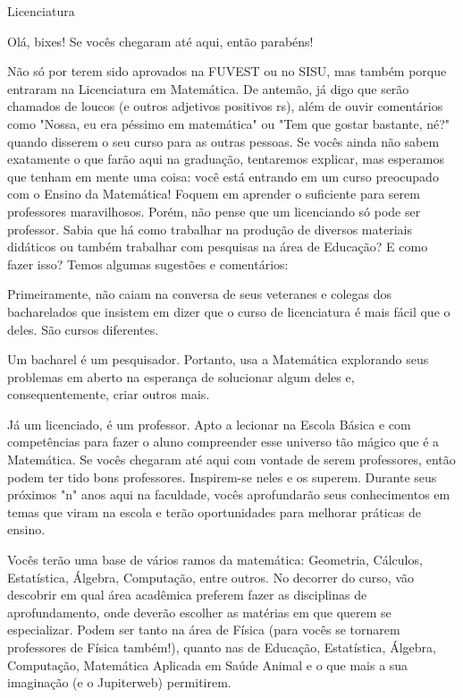 \begin{subsecao}{Licenciatura}

Olá, bixes! Se vocês chegaram até aqui, então parabéns!

Não só por terem sido aprovados na FUVEST ou no SISU, mas também porque entraram
na Licenciatura em Matemática. De antemão, já digo que serão chamados de loucos (e outros
adjetivos positivos rs), além de ouvir comentários como "Nossa, eu era péssimo 
em matemática" ou "Tem que gostar bastante, né?" quando disserem o seu curso para as 
outras pessoas.
Se vocês ainda não sabem exatamente o que farão aqui na graduação, tentaremos
explicar, mas esperamos que tenham em mente uma coisa: você está entrando em um
curso preocupado com o Ensino da Matemática! Foquem em aprender o suficiente para 
serem professores maravilhosos. Porém, não pense que um licenciando só pode ser professor.
Sabia que há como trabalhar na produção de diversos materiais didáticos ou também trabalhar
com pesquisas na área de Educação? E como fazer isso?  Temos algumas sugestões e comentários:

Primeiramente, não caiam na conversa de seus veteranes e colegas dos bacharelados
que insistem em dizer que o curso de licenciatura é mais fácil que o deles. São
cursos diferentes.

Um bacharel é um pesquisador. Portanto, usa a Matemática explorando seus
problemas em aberto na esperança de solucionar algum deles e, consequentemente,
criar outros mais.

Já um licenciado, é um professor. Apto a lecionar na Escola Básica e com
competências para fazer o aluno compreender esse universo tão mágico que é a
Matemática. Se vocês chegaram até aqui com vontade de serem professores, então
podem ter tido bons professores. Inspirem-se neles e os superem. Durante seus 
próximos "n" anos aqui na faculdade, vocês aprofundarão seus conhecimentos em 
temas que viram na escola e terão oportunidades para melhorar práticas de ensino.
 

Vocês terão uma base de vários ramos da matemática: Geometria, Cálculos,
Estatística, Álgebra, Computação, entre outros. No decorrer do curso, vão
descobrir em qual área acadêmica preferem fazer as disciplinas de
aprofundamento, onde deverão escolher as matérias em que querem se especializar.
Podem ser tanto na área de Física (para vocês se tornarem professores de Física
também!), quanto nas de Educação, Estatística, Álgebra, Computação, Matemática
Aplicada em Saúde Animal e o que mais a sua imaginação (e o Jupiterweb) permitirem.


\end{subsecao}
